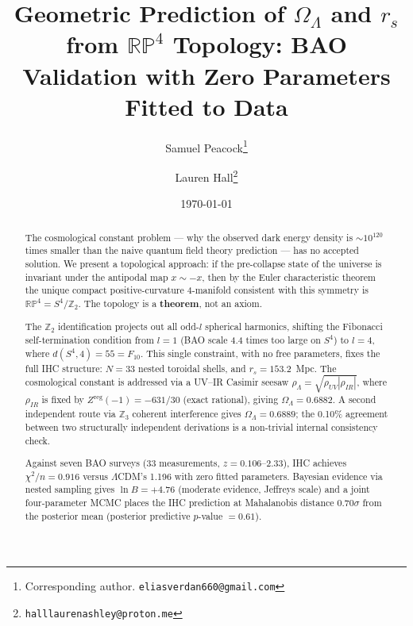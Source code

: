 \documentclass[12pt,a4paper]{article}
\begin{document}
\title{Geometric Prediction of $\Omega_\Lambda$ and $r_s$ from
$\mathbb{RP}^4$ Topology: BAO Validation with Zero Parameters Fitted to Data}

\author{
  Samuel Peacock\thanks{Corresponding author. \texttt{eliasverdan660@gmail.com}}
  \and
  Lauren Hall\thanks{\texttt{halllaurenashley@proton.me}}
}

\date{\today}

\maketitle

\begin{abstract}
The cosmological constant problem --- why the observed dark energy density is
$\sim 10^{120}$ times smaller than the naive quantum field theory prediction ---
has no accepted solution. We present a topological approach: if the pre-collapse
state of the universe is invariant under the antipodal map $x \sim -x$, then by
the Euler characteristic theorem the unique compact positive-curvature 4-manifold
consistent with this symmetry is $\mathbb{RP}^4 = S^4/\mathbb{Z}_2$. The topology
is a \textbf{theorem}, not an axiom.

The $\mathbb{Z}_2$ identification projects out all odd-$l$ spherical harmonics,
shifting the Fibonacci self-termination condition from $l = 1$ (BAO scale
4.4 times too large on $S^4$) to $l = 4$, where $d(S^4, 4) = 55 = F_{10}$.
This single constraint, with no free parameters, fixes the full IHC structure:
$N = 33$ nested toroidal shells, and $r_s = 153.2$~Mpc.
The cosmological constant is addressed via a UV--IR Casimir seesaw
$\rho_\Lambda = \sqrt{\rho_{UV}|\rho_{IR}|}$, where $\rho_{IR}$ is fixed by
$Z^\mathrm{reg}(-1) = -631/30$ (exact rational), giving $\Omega_\Lambda = 0.6882$.
A second independent route via $\mathbb{Z}_3$ coherent interference gives
$\Omega_\Lambda = 0.6889$; the 0.10\% agreement between two structurally
independent derivations is a non-trivial internal consistency check.

Against seven BAO surveys (33 measurements, $z = 0.106$--$2.33$), IHC achieves
$\chi^2/n = 0.916$ versus $\Lambda$CDM's 1.196 with zero fitted parameters.
Bayesian evidence via nested sampling gives $\ln B = +4.76$ (moderate evidence,
Jeffreys scale) and a joint four-parameter MCMC places the IHC prediction at
Mahalanobis distance $0.70\sigma$ from the posterior mean
(posterior predictive $p$-value $= 0.61$).\end{abstract}
\end{document}

